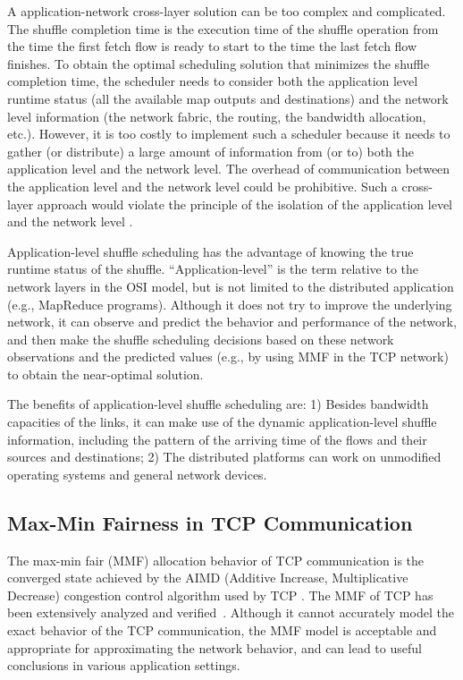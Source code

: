 \documentclass[10pt,journal,compsoc]{IEEEtran}
\begin{document}
A application-network cross-layer solution can be too complex and complicated. 
The shuffle completion time is the execution time of the shuffle operation 
from the time the first fetch flow is ready to start to the time the last fetch flow 
finishes. 
To obtain the optimal scheduling solution that minimizes the shuffle
completion time, the scheduler needs to consider both the
application level runtime status (all the available map outputs and
destinations) and the network level information (the network fabric,
the routing, the bandwidth allocation, etc.).
However, it is too costly %
to implement such a scheduler
because it needs to gather (or distribute) a large amount of information
from (or to) both the application level and the network level.
The overhead of communication between the application level and the
network level could be prohibitive.
Such a cross-layer approach would violate the
principle of the isolation of the application level and the network
level \cite{saltzer1984end}.

Application-level shuffle scheduling has the advantage of knowing
the true runtime status of the shuffle.
``Application-level'' is the term relative to the network layers in 
the OSI model, but is not limited to the distributed application (e.g., MapReduce programs). 
Although it does not try to improve the underlying network, 
it can observe and predict the behavior and performance of the network, 
and then make the shuffle scheduling decisions based on
these network observations and the predicted values (e.g., by using MMF in the TCP
network) to obtain the near-optimal solution. 


The benefits of application-level shuffle scheduling are: 1) Besides bandwidth capacities of the links, 
it can make use of 
the dynamic application-level shuffle information, including the pattern of the 
arriving time of the flows and their sources and destinations; 
2) The distributed platforms can work on unmodified operating systems and general network devices. 



\subsection{Max-Min Fairness in TCP Communication}\label{section:MMF}
The max-min fair (MMF) allocation behavior of TCP communication %
is the converged state achieved by the 
AIMD (Additive Increase, Multiplicative Decrease) congestion control
algorithm used by TCP \cite{jacobson1988congestion}.
The MMF of TCP has been extensively
analyzed and verified~\cite{%
chiu1989analysis, kelly1998rate, vojnovic2000global}.
Although it cannot accurately model the exact behavior of the TCP
communication, the MMF model is acceptable and appropriate for
approximating the network behavior, and can lead to useful conclusions in
various application settings.
 
\end{document}
